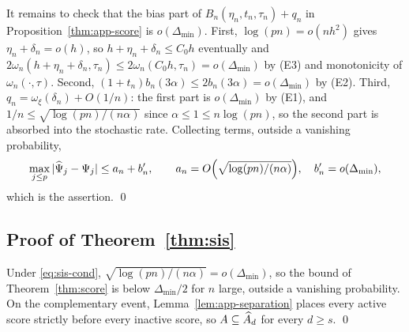 It remains to check that the bias part of $B_n(\eta_n,t_n,\tau_n)+q_n$ in
Proposition~\ref{thm:app-score} is
$o(\Delta_{\min})$.  First, $\log(pn)=o(nh^2)$ gives
$\eta_n+\delta_n=o(h)$, so $h+\eta_n+\delta_n\le C_0h$ eventually and
$2\omega_n(h+\eta_n+\delta_n,\tau_n)\le2\omega_n(C_0h,\tau_n)
=o(\Delta_{\min})$ by (E3) and monotonicity of
$\omega_n(\cdot,\tau)$.  Second,
$(1+t_n)b_n(3\alpha)\le2b_n(3\alpha)=o(\Delta_{\min})$ by (E2).  Third,
$q_n=\omega_\xi(\delta_n)+O(1/n)$: the first part is
$o(\Delta_{\min})$ by (E1), and
$1/n\le\sqrt{\log(pn)/(n\alpha)}$ since $\alpha\le1\le n\log(pn)$, so
the second part is absorbed into the stochastic rate.  Collecting terms,
outside a vanishing probability,
\[
 \max_{j\le p}|\widehat\Psi_j-\Psi_j|
 \le a_n+b_n',\qquad
 a_n=O\Bigl(\sqrt{\log(pn)/(n\alpha)}\Bigr),\quad
 b_n'=o(\Delta_{\min}),
\]
which is the assertion.  \qed

\subsection{Proof of Theorem~\ref{thm:sis}}

Under \eqref{eq:sis-cond},
$\sqrt{\log(pn)/(n\alpha)}=o(\Delta_{\min})$, so the bound of
Theorem~\ref{thm:score} is below $\Delta_{\min}/2$ for $n$ large,
outside a vanishing probability.  On the complementary event,
Lemma~\ref{lem:app-separation} places every active score strictly before
every inactive score, so $A\subseteq\widehat{A}_d$ for every $d\ge s$.  \qed
